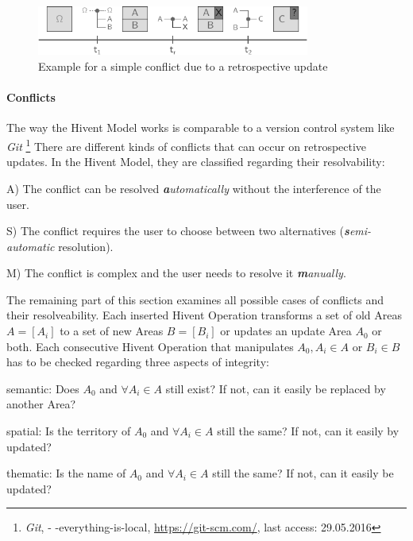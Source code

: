 \begin{figure}[H]
  \vspace{1em}
  \centering
  \includegraphics[width=0.8\textwidth]{graphics/development/editing_hivent_data/retrospective_updates/example}
  \caption{Example for a simple conflict due to a retrospective update}
  \label{fig:update_conflict_example}
\end{figure}


\paragraph{Conflicts} %
\label{par:conflicts}

The way the Hivent Model works is comparable to a version control system like \emph{Git}
\footnote{
  \emph{Git},
  - -everything-is-local,
  \url{https://git-scm.com/},
  last access: 29.05.2016
}
There are different kinds of conflicts that can occur on retrospective updates. In the Hivent Model, they are classified regarding their resolvability:

\begin{compactenum}
  \item[A)] The conflict can be resolved \emph{\textbf{a}utomatically} without the interference of the user.
  \item[S)] The conflict requires the user to choose between two alternatives (\emph{\textbf{s}emi-automatic} resolution).
  \item[M)] The conflict is complex and the user needs to resolve it \emph{\textbf{m}anually}.
\end{compactenum}

The remaining part of this section examines all possible cases of conflicts and their resolveability. Each inserted Hivent Operation transforms a set of old Areas $A = [A_i]$ to a set of new Areas $B = [B_i]$ or updates an update Area $A_0$ or both. Each consecutive Hivent Operation that manipulates $A_0, A_i \in A$ or $B_i \in B$ has to be checked regarding three aspects of integrity:

\begin{compactenum}
  \item semantic: Does $A_0$ and $\forall A_i \in A$ still exist? If not, can it easily be replaced by another Area?
  \item spatial: Is the territory of $A_0$ and $\forall A_i \in A$ still the same? If not, can it easily by updated?
  \item thematic: Is the name of $A_0$ and $\forall A_i \in A$ still the same? If not, can it easily be updated?
\end{compactenum}

